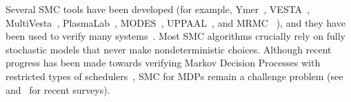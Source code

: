 \documentclass[11pt]{article}
\theoremstyle{definition}
\newcommand{\sayan}[1]{\textcolor{blue}{#1}}
\newcommand{\M}{\mathcal{M}}
\newcommand{\execs}[1]{{{\rm{Execs}}_{#1}}}
\begin{document}
Several SMC  tools have been developed (for example, Ymer~\cite{Ymer}, VESTA~\cite{VESTA:SenVA05}, MultiVesta~\cite{MVesta}, PlasmaLab~\cite{Boyer:2013:PFD}, MODES~\cite{MODES}, UPPAAL~\cite{UPPAAL}, and MRMC~\cite{MRMC}
),
and they have been used to verify many systems~\cite{DDavidLLMPVW11,BaierHHK02,JhaCLLPZ09,KyleHC15,PalaniappanG0HT13,ZulianiPC13,Meseguer:2006:SAD,Martins:2011:SMC}.
%
Most SMC algorithms crucially rely on fully stochastic models that never  make nondeterministic choices. Although  recent progress has been made towards verifying Markov Decision Processes with restricted types of schedulers~\cite{lassaigne2015approximate,DBLP:conf/tacas/HartmannsH14,henriques2012statistical},
SMC for MDPs remain a challenge problem (see~\cite{Agha:2018:SSM} and~\cite{Legay:2015} for recent surveys).
%



%
%


%
%
\end{document}
